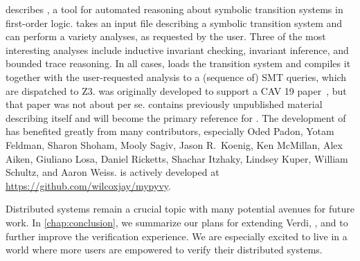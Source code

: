  describes \mypyvy,
  a tool for automated reasoning
  about symbolic transition systems in first-order logic.
\mypyvy takes an input file
  describing a symbolic transition system
  and can perform a variety analyses, as requested by the user.
Three of the most interesting analyses include
  inductive invariant checking,
  invariant inference, and
  bounded trace reasoning.
In all cases, \mypyvy loads the transition system
  and compiles it together with the user-requested analysis
  to a (sequence of) SMT queries,
  which are dispatched to Z3.
\mypyvy was originally developed to support a CAV 19 paper~\cite{phase-updr},
  but that paper was not about \mypyvy per se.
 contains previously unpublished material describing \mypyvy itself
  and will become the primary reference for \mypyvy.
The development of \mypyvy has benefited greatly from many contributors,
  especially Oded Padon, Yotam Feldman, Sharon Shoham, Mooly Sagiv, Jason R.\ Koenig,
  Ken McMillan, Alex Aiken, Giuliano Losa,
  Daniel Ricketts, Shachar Itzhaky, Lindsey Kuper, William Schultz, and Aaron Weiss.
\mypyvy is actively developed at \url{https://github.com/wilcoxjay/mypyvy}.

Distributed systems remain a crucial topic
  with many potential avenues for future work.
In \cref{chap:conclusion},
  we summarize our plans
  for extending Verdi, \disel, and \mypyvy
  to further improve the verification experience.
We are especially excited
  to live in a world where more users
  are empowered to verify their distributed systems.